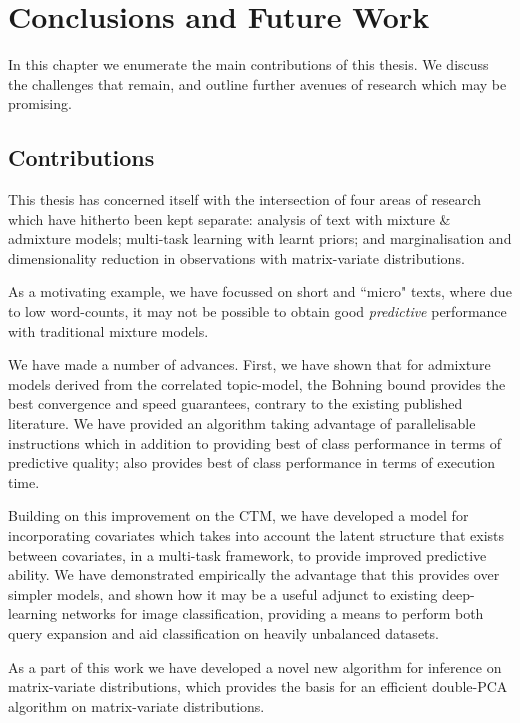 

\chapter{Conclusions and Future Work}
In this chapter we enumerate the main contributions of this thesis. We discuss the challenges that remain, and outline further avenues of research which may be promising.

\section{Contributions}
This thesis has concerned itself with the intersection of four areas of research which have hitherto been kept separate: analysis of text with mixture \& admixture models; multi-task learning with learnt priors; and marginalisation and dimensionality reduction in observations with matrix-variate distributions.

As a motivating example, we have focussed on short and ``micro" texts, where due to low word-counts, it may not be possible to obtain good \emph{predictive} performance with traditional mixture models. 

We have made a number of advances. First, we have shown that for admixture models derived from the correlated topic-model\cite{Blei2006}, the Bohning bound provides the best convergence and speed guarantees, contrary to the existing published literature\cite{Wang2013}. We have provided an algorithm taking advantage of parallelisable instructions which in addition to providing best of class performance in terms of predictive quality; also provides best of class performance in terms of execution time.

Building on this improvement on the CTM, we have developed a model for incorporating covariates which takes into account the latent structure that exists between covariates, in a multi-task framework, to provide improved predictive ability. We have demonstrated empirically the advantage that this provides over simpler models\cite{Mimno2008}, and shown how it may be a useful adjunct to existing deep-learning networks for image classification, providing a means to perform both query expansion and aid classification on heavily unbalanced datasets.

As a part of this work we have developed a novel new algorithm for inference on matrix-variate distributions, which provides the basis for an efficient double-PCA algorithm on matrix-variate distributions.


